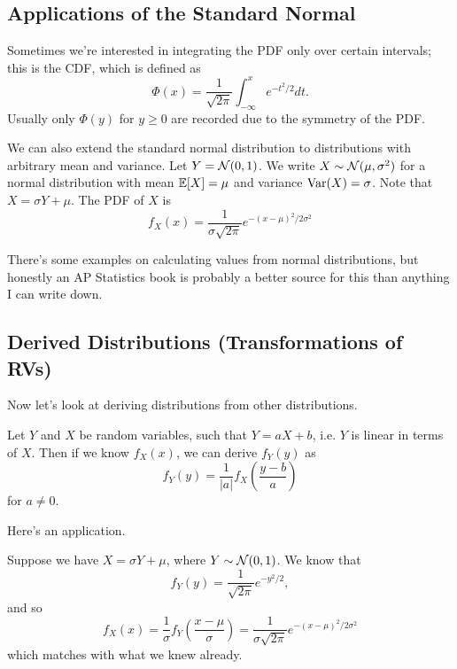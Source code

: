 \documentclass[11 pt]{scrartcl}
\begin{document}
\subsection{Applications of the Standard Normal}
    Sometimes we're interested in integrating the PDF only over certain intervals; this is the CDF, which is defined as 
    \[ \Phi(x) = \dfrac{1}{\sqrt{2\pi}} \int_{-\infty}^x e^{-t^2/2} dt.\] 
    Usually only $\Phi(y)$ for $y\geq 0$ are recorded due to the symmetry of the PDF. 

    We can also extend the standard normal distribution to distributions with arbitrary mean and variance. Let $Y = \mathcal{N}(0,1)$. We write $X \sim \mathcal{N}(\mu, \sigma^2)$ for a normal distribution with mean $\mathbb E[X] = \mu$ and variance $\text{Var}(X) = \sigma$. Note that $X = \sigma Y + \mu$. The PDF of $X$ is 
    \[ f_X(x) = \dfrac{1}{\sigma\sqrt{2\pi}}e^{-(x-\mu)^2/2\sigma^2}\]

    There's some examples on calculating values from normal distributions, but honestly an AP Statistics book is probably a better source for this than anything I can write down. 

    \subsection{Derived Distributions (Transformations of RVs)}
Now let's look at deriving distributions from other distributions. 
\begin{theorem}
    Let $Y$ and $X$ be random variables, such that $Y = aX + b$, i.e. $Y$ is linear in terms of $X$.  Then if we know $f_X(x)$, we can derive $f_Y(y)$ as 
    \[ f_Y(y) = \dfrac{1}{|a|} f_X\left(\dfrac{y-b}{a}\right)\] 
    for $a\not= 0$. 
\end{theorem}

Here's an application. 
\begin{example}
    Suppose we have $X = \sigma Y + \mu$, where $Y\sim\mathcal{N}(0,1)$. We know that 
    \[ f_Y(y) = \dfrac{1}{\sqrt{2\pi}} e^{-y^2/2},\] 
    and so 
    \[ f_X(x) = \dfrac{1}{\sigma} f_Y\left(\dfrac{x-\mu}{\sigma}\right) = \dfrac{1}{\sigma\sqrt{2\pi}}e^{-(x-\mu)^2/2\sigma^2} \] 
    which matches with what we knew already. 
\end{example}
\end{document}
